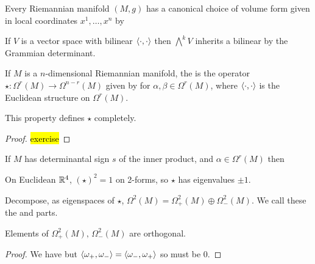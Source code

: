 \documentclass{article}
\begin{document}
\begin{lemma}
	Every Riemannian manifold $(M,g)$ has a canonical choice of volume form given in local coordinates $x^1, \dots, x^n$ by 
\end{lemma}

\begin{lemma}
	If $V$ is a vector space with bilinear $\left\langle \cdot, \cdot \right\rangle$ then $\bigwedge^k V$ inherits a bilinear by the Grammian determinant. 
\end{lemma}

\begin{definition}
	If $M$ is a $n$-dimensional Riemannian manifold, the  is the operator $\star : \Omega^r(M) \to \Omega^{n-r}(M)$ given by 
	for $\alpha,\beta \in \Omega^r(M)$, where $\left\langle \cdot,\cdot \right\rangle$ is the Euclidean structure on $\Omega^r(M)$. 
\end{definition}

\begin{lemma}
	This property defines $\star$ completely. 
\end{lemma}
\begin{proof}
	\hl{exercise}
\end{proof}

\begin{prop}
	If $M$ has determinantal sign $s$ of the inner product, and $\alpha \in \Omega^r(M)$ then 
\end{prop}
\begin{corollary}
	On Euclidean $\mathbb{R}^4$, $(\star)^2 = 1$ on 2-forms, so $\star$ has eigenvalues $\pm 1$. 
\end{corollary}
\begin{definition}
	Decompose, as eigenspaces of $\star$, $\Omega^2(M) = \Omega^2_+(M) \oplus \Omega^2_-(M)$. We call these the  and  parts.
\end{definition}

\begin{lemma}
	Elements of $\Omega^2_+(M), \, \Omega^2_-(M)$ are orthogonal. 
\end{lemma}
\begin{proof}
	We have 
	but $\left\langle \omega_+, \omega_- \right\rangle = \left\langle \omega_-, \omega_+ \right\rangle$ so must be 0. 
\end{proof}
\end{document}
